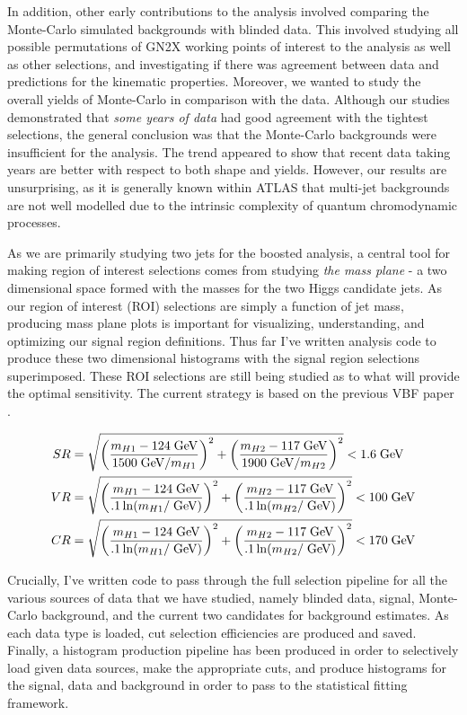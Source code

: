 \documentclass[12pt]{article}
\begin{document}
In addition, other early contributions to the analysis involved comparing the
Monte-Carlo simulated backgrounds with blinded data. This involved studying all
possible permutations of GN2X working points of interest to the analysis as well
as other selections, and investigating if there was agreement between data and
predictions for the kinematic properties. Moreover, we wanted to study the
overall yields of Monte-Carlo in comparison with the data. Although our studies
demonstrated that \textit{some years of data} had good agreement with the
tightest selections, the general conclusion was that the Monte-Carlo backgrounds
were insufficient for the analysis. The trend appeared to show that recent data
taking years are better with respect to both shape and yields. However, our
results are unsurprising, as it is generally known within ATLAS that multi-jet
backgrounds are not well modelled due to the intrinsic complexity of quantum
chromodynamic processes.

As we are primarily studying two jets for the boosted analysis, a central tool
for making region of interest selections comes from studying \textit{the mass
plane} - a two dimensional space formed with the masses for the two Higgs
candidate jets. As our region of interest (ROI) selections are simply a function
of jet mass, producing mass plane plots is important for visualizing,
understanding, and optimizing our signal region definitions. Thus far I've
written analysis code to produce these two dimensional histograms with the
signal region selections superimposed. These ROI selections are still being
studied as to what will provide the optimal sensitivity. The current strategy is
based on the previous VBF paper \cite{atlas_hhbbbb_vbf}.

\begin{align}
    SR &= \sqrt{\left( \frac{m_{H1}-124\;\text{GeV}}{1500\;\text{GeV}/m_{H1}}
    \right)^2 + \left( \frac{m_{H2}-117\;\text{GeV}}{1900\;\text{GeV}/m_{H2}}
    \right)^2} < 1.6 \;\text{GeV} \\
    VR &= \sqrt{\left( \frac{m_{H1}-124\;\text{GeV}}{.1\ln(m_{H1}/\;\text{GeV})}
    \right)^2 + \left( \frac{m_{H2}-117\;\text{GeV}}{.1\ln(m_{H2}/\;\text{GeV})}
    \right)^2} < 100 \;\text{GeV} \\
    CR &= \sqrt{\left( \frac{m_{H1}-124\;\text{GeV}}{.1\ln(m_{H1}/\;\text{GeV})}
    \right)^2 + \left( \frac{m_{H2}-117\;\text{GeV}}{.1\ln(m_{H2}/\;\text{GeV})}
    \right)^2} < 170 \;\text{GeV}
\end{align}

Crucially, I've written code to pass through the full selection pipeline for all
the various sources of data that we have studied, namely blinded data, signal,
Monte-Carlo background, and the current two candidates for background estimates.
As each data type is loaded, cut selection efficiencies are produced and saved.
Finally, a histogram production pipeline has been produced in order to
selectively load given data sources, make the appropriate cuts, and produce
histograms for the signal, data and background in order to pass to the
statistical fitting framework. %
\end{document}
